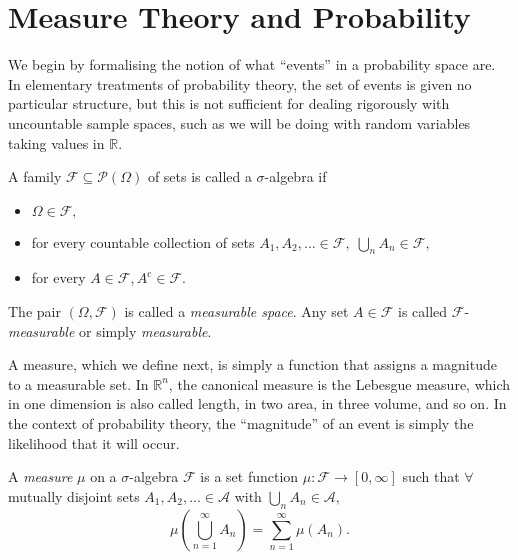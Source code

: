 \section{Measure Theory and Probability}\label{sec:1.3}

We begin by formalising the notion of what ``events'' in a probability space are.
In elementary treatments of probability theory, the set of events is given no particular 
structure, but this is not sufficient for dealing rigorously with uncountable sample 
spaces, such as we will be doing with random variables taking values in $\mathbb{R}$.

\begin{definition}
    A family $\mathcal{F}\subseteq\mathcal{P}(\Omega)$ of sets is called a $\sigma$-algebra if 
    \begin{itemize}
        \item $\Omega\in\mathcal{F},$
        \item for every countable collection of sets $A_1,A_2,...\in\mathcal{F},\;\bigcup_{n}A_n\in\mathcal{F},$
        \item for every $A\in\mathcal{F}, A^{\mathrm c}\in\mathcal{F}.$
    \end{itemize}
\end{definition}

\begin{remark}
    The pair $(\Omega,\mathcal{F})$ is called a \emph{measurable space}. Any set $A\in\mathcal{F}$
    is called $\mathcal{F}$-\emph{measurable} or simply \emph{measurable}.
\end{remark}

A measure, which we define next, is simply a function that assigns a magnitude 
to a measurable set. In $\mathbb{R}^n$, the canonical measure is the Lebesgue 
measure, which in one dimension is also called length, in two area, in three volume,
and so on. In the context of probability theory, the ``magnitude'' of an event is 
simply the likelihood that it will occur.

\begin{definition}[Measure]
    A \emph{measure} $\mu$ on a $\sigma$-algebra $\mathcal{F}$ is a set function
    $\mu:\mathcal{F}\rightarrow[0,\infty]$ such that $\forall$ mutually disjoint
    sets $A_1,A_2,...\in\mathcal{A}$ with $\bigcup_nA_n\in\mathcal{A},$
    \begin{equation*}
        \mu\left(\bigcup_{n=1}^{\infty}A_n\right)=\sum_{n=1}^{\infty}\mu(A_n).
    \end{equation*}
\end{definition}

